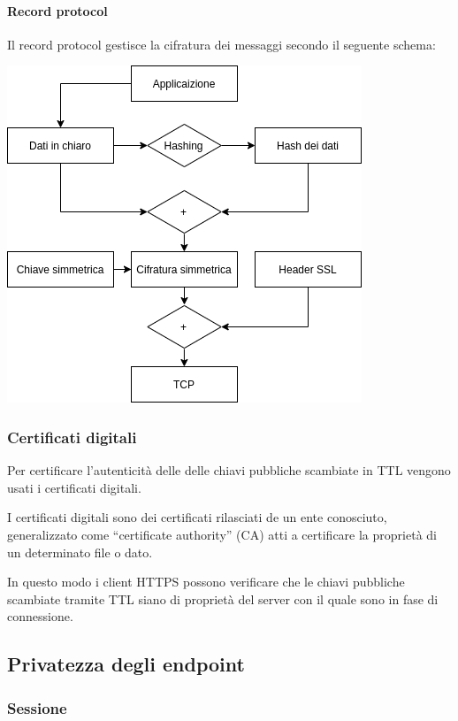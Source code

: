 \documentclass{article}
\begin{document}
\paragraph{Record protocol}
Il record protocol gestisce la cifratura dei messaggi secondo il seguente schema:
\begin{center}
    \includegraphics[scale=0.50]{../images/ttl.png}
\end{center}


\subsubsection{Certificati digitali}

Per certificare l'autenticità delle delle chiavi pubbliche scambiate in TTL vengono usati i certificati digitali.

I certificati digitali sono dei certificati rilasciati de un ente conosciuto, generalizzato come ``certificate authority'' (CA) atti a certificare la proprietà di un determinato file o dato.

In questo modo i client HTTPS possono verificare che le chiavi pubbliche scambiate tramite TTL siano di proprietà del server con il quale sono in fase di connessione.

\subsection{Privatezza degli endpoint}

\subsubsection{Sessione}
\end{document}
